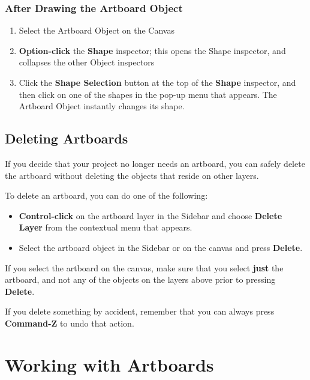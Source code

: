 \documentclass[../main.tex]{subfiles}
\begin{document}
\subsubsection{After Drawing the Artboard Object}

\begin{enumerate}
  \item Select the Artboard Object on the Canvas
  \item \textbf{Option-click} the \textbf{Shape} inspector; this opens the Shape inspector, and
    collapses the other Object inspectors
  \item Click the \textbf{Shape Selection} button at the top of the \textbf{Shape} inspector,
    and then click on one of the shapes in the pop-up menu that appears. The Artboard Object
    instantly changes its shape.
\end{enumerate}

\subsection{Deleting Artboards}

If you decide that your project no longer needs an artboard, you can safely delete the artboard
without deleting the objects that reside on other layers.

To delete an artboard, you can do one of the following:

\begin{itemize}
  \item \textbf{Control-click} on the artboard layer in the Sidebar and choose \textbf{Delete
    Layer} from the contextual menu that appears.
  \item Select the artboard object in the Sidebar or on the canvas and press \textbf{Delete}.
\end{itemize}

\begin{ogwarning}
  If you select the artboard on the canvas, make sure that you select \textbf{just} the artboard,
  and not any of the objects on the layers above prior to pressing \textbf{Delete}.

  If you delete something by accident, remember that you can always press \textbf{Command-Z} to
  undo that action.
\end{ogwarning}

\section{Working with Artboards}
\end{document}
